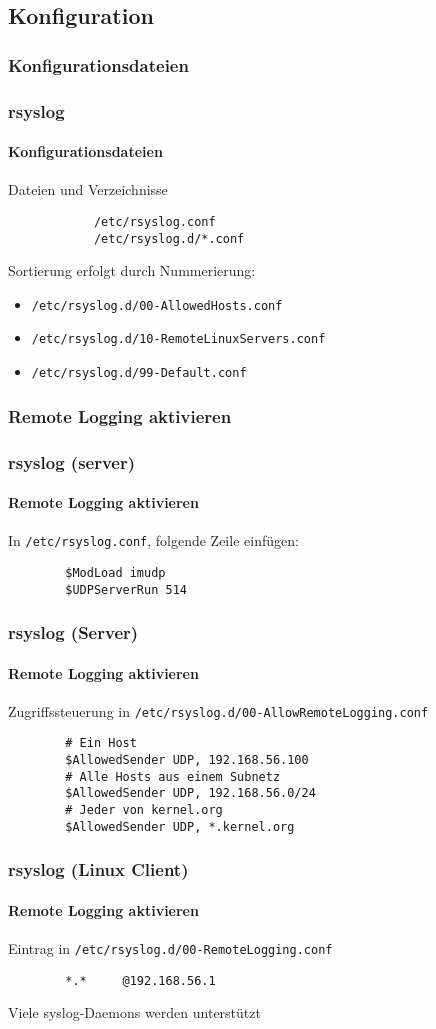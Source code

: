\subsection{Konfiguration}
\subsubsection{Konfigurationsdateien}
\begin{frame}[fragile]
	\frametitle{rsyslog}
	\framesubtitle{Konfigurationsdateien}
	\begin{block}{Dateien und Verzeichnisse}
		\begin{verbatim}
			/etc/rsyslog.conf
			/etc/rsyslog.d/*.conf
		\end{verbatim}
	\end{block}
	Sortierung erfolgt durch Nummerierung:
	\begin{itemize}
		\item \verb|/etc/rsyslog.d/00-AllowedHosts.conf|
		\item \verb|/etc/rsyslog.d/10-RemoteLinuxServers.conf|
		\item \verb|/etc/rsyslog.d/99-Default.conf|
	\end{itemize}
\end{frame}

\subsubsection{Remote Logging aktivieren}
\begin{frame}[fragile]
	\frametitle{rsyslog (server)}
	\framesubtitle{Remote Logging aktivieren}
	In \verb|/etc/rsyslog.conf|, folgende Zeile einfügen:
	\begin{verbatim}
		$ModLoad imudp
		$UDPServerRun 514
	\end{verbatim}
\end{frame}
\begin{frame}[fragile]
	\frametitle{rsyslog (Server)}
	\framesubtitle{Remote Logging aktivieren}
	Zugriffssteuerung in \verb|/etc/rsyslog.d/00-AllowRemoteLogging.conf|
	\begin{verbatim}
		# Ein Host
		$AllowedSender UDP, 192.168.56.100
		# Alle Hosts aus einem Subnetz
		$AllowedSender UDP, 192.168.56.0/24
		# Jeder von kernel.org
		$AllowedSender UDP, *.kernel.org
	\end{verbatim}
\end{frame}

\begin{frame}[fragile]
	\frametitle{rsyslog (Linux Client)}
	\framesubtitle{Remote Logging aktivieren}
	Eintrag in \verb|/etc/rsyslog.d/00-RemoteLogging.conf|
	\begin{verbatim}
		*.*		@192.168.56.1
	\end{verbatim}
	Viele syslog-Daemons werden unterstützt
\end{frame}
